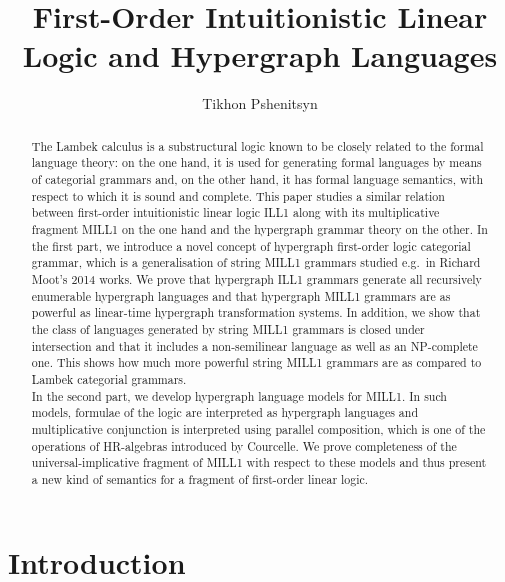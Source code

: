 \documentclass[a4paper,UKenglish,cleveref, autoref, thm-restate,pdfa]{lipics-v2021}
\title{First-Order Intuitionistic Linear Logic and Hypergraph Languages}
\author{Tikhon Pshenitsyn}{Steklov Mathematical Institute of RAS, 8 Gubkina St., Moscow 119991, Russian Federation \and \url{https://www.researchgate.net/profile/Tikhon-Pshenitsyn} }{tpshenitsyn@mi-ras.ru}{https://orcid.org/0000-0003-4779-3143}{}
\begin{document}
\maketitle

\begin{abstract}
	The Lambek calculus is a substructural logic known to be closely related to the formal language theory: on the one hand, it is used for generating formal languages by means of categorial grammars and, on the other hand, it has formal language semantics, with respect to which it is sound and complete. This paper studies a similar relation between first-order intuitionistic linear logic ILL1 along with its multiplicative fragment MILL1 on the one hand and the hypergraph grammar theory on the other. 
	In the first part, we introduce a novel concept of hypergraph first-order logic categorial grammar, which is a generalisation of string MILL1 grammars studied e.g.~in Richard Moot's 2014 works. We prove that hypergraph ILL1 grammars generate all recursively enumerable hypergraph languages and that hypergraph MILL1 grammars are as powerful as linear-time hypergraph transformation systems. In addition, we show that the class of languages generated by string MILL1 grammars is closed under intersection and that it includes a non-semilinear language as well as an NP-complete one. This shows how much more powerful string MILL1 grammars are as compared to Lambek categorial grammars.
	\\
	In the second part, we develop hypergraph language models for MILL1. In such models, formulae of the logic are interpreted as hypergraph languages and multiplicative conjunction is interpreted using parallel composition, which is one of the operations of HR-algebras introduced by Courcelle. We prove completeness of the universal-implicative fragment of MILL1 with respect to these models and thus present a new kind of semantics for a fragment of first-order linear logic. 
\end{abstract}

\section{Introduction}\label{section:introduction}
\end{document}
